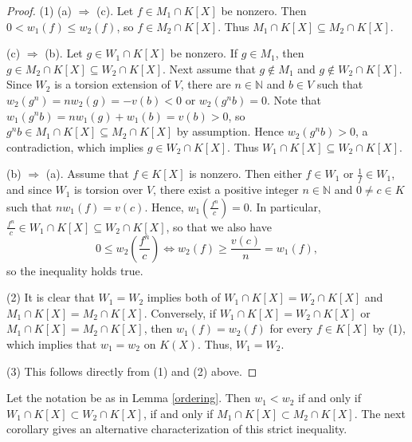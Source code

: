 \documentclass[10pt]{article}
\numberwithin{equation}{section}
\theoremstyle{definition}
\theoremstyle{definition}
\newcommand{\N}{\mathbb{N}}
\newcommand\rc { \color{red}}
\begin{document}
\begin{proof}
(1) (a) $\Rightarrow$ (c). Let $f\in M_1\cap K[X]$ be nonzero. Then $0 < w_1(f)\leq w_2(f)$, so $f\in M_2\cap K[X]$.
Thus $M_1\cap K[X]\subseteq M_2\cap K[X].$ 

(c) $\Rightarrow$ (b). Let $g\in W_1\cap K[X]$ be nonzero. If $g \in M_1$, then $g \in M_2 \cap K[X] \subseteq W_2 \cap K[X]$.
Next assume that $g \not\in M_1$ and $g \not\in W_2 \cap K[X]$. Since $W_2$ is a torsion extension of $V$,
there are $n \in \mathbb{N}$ and $b \in V$ such that $w_2(g^n) = nw_2(g) = -v(b) <0$ or $w_2(g^nb) =0$.
Note that $w_1(g^nb) = nw_1(g)+w_1(b) = v(b) >0$, so $g^nb \in M_1 \cap K[X] \subseteq M_2 \cap K[X]$
by assumption. Hence $w_2(g^nb) > 0$, a contradiction, which implies $g \in W_2 \cap K[X]$.
Thus $W_1\cap K[X]\subseteq W_2\cap K[X].$

(b) $\Rightarrow$ (a). Assume that $f\in K[X]$ is nonzero. Then either $f \in W_1$ or $\frac{1}{f} \in W_1$, and since
$W_1$ is torsion over $V$, there exist a positive integer  $n\in\N$ and $0 \neq c\in K$ such that $nw_1(f)=v(c)$. 
Hence, $w_1(\frac{f^n}{c}) = 0$. 
In particular, $\frac{f^n}{c}\in W_1\cap K[X]\subseteq W_2\cap K[X]$, so that we also have
$$0\leq w_2\left(\frac{f^n}{c}\right)\Leftrightarrow w_2(f)\geq\frac{v(c)}{n}=w_1(f),$$
so the inequality holds true. 

(2) It is clear that $W_1=W_2$ implies both of $W_1\cap K[X]=W_2\cap K[X]$ 
and $M_1\cap K[X]= M_2\cap K[X]$. Conversely, if $W_1\cap K[X]=W_2\cap K[X]$ or $M_1\cap K[X]= M_2\cap K[X]$,  
then $w_1(f)=w_2(f)$ for every $f\in K[X]$ by (1), which implies that $w_1=w_2$ on $K(X)$. Thus, $W_1=W_2$.

(3) This follows directly from (1) and (2) above.
\end{proof}

Let the notation be as in Lemma \ref{ordering}.
Then $w_1<w_2$ if and only if $W_1\cap K[X]\subset W_2\cap K[X]$,
if and only if $M_1\cap K[X]\subset M_2\cap K[X]$. The next corollary gives an alternative characterization of this strict inequality.
\end{document}
